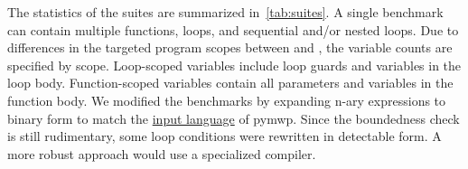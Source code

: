 The statistics of the suites are summarized in~\autoref{tab:suites}.
A single benchmark can contain multiple functions, loops, and sequential and/or nested loops.
Due to differences in the targeted program scopes between \impl and \impf, the variable counts are specified by scope.
Loop-scoped variables include loop guards and variables in the loop body.
Function-scoped variables contain all parameters and variables in the function body.
We modified the benchmarks by expanding n-ary expressions to binary form to match the \href{https://statycc.github.io/pymwp/features/}{input language} of pymwp.
Since the boundedness check is still rudimentary, some loop conditions were rewritten in detectable form.
A more robust approach would use a specialized compiler.
